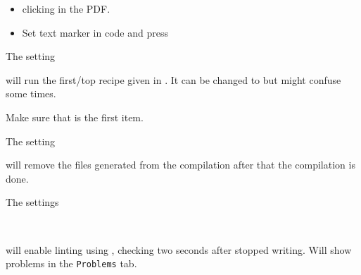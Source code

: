\begin{itemize}
    \item {} clicking in the PDF.
    \item Set text marker in code and press 
\end{itemize}


The setting


will run the first/top recipe given in . It can be changed to  but might confuse some times.

Make sure that  is the first item.



The setting


will remove the  files generated from the compilation after that the compilation is done.



The settings

\\

will enable linting using , checking two seconds after stopped writing. Will show problems in the \texttt{Problems} tab.

